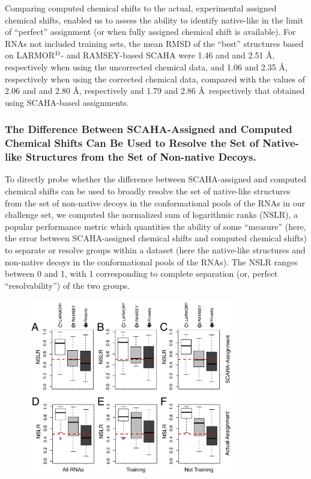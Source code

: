 \documentclass[journal=jcisd8,manuscript=article,layout=onecolumn]{achemso}
\begin{document}
{Comparing computed chemical shifts to the actual, experimental assigned chemical shifts, enabled us to assess the ability to identify native-like in the limit of ``perfect'' assignment (or when fully assigned chemical shift is available). For RNAs not included training sets, the mean RMSD of the ``best'' structures based on LARMOR$^{\rm D}$- and RAMSEY-based SCAHA were 1.46 and  and 2.51 \AA, respectively when using the uncorrected chemical data, and 1.06 and 2.35 \AA, respectively when using the corrected chemical data, compared with the values of 2.06 and  and 2.80 \AA, respectively and 1.79 and 2.86 \AA\, respectively that obtained using SCAHA-based assignments. 

\subsubsection{The Difference Between SCAHA-Assigned and Computed Chemical Shifts Can Be Used to Resolve the Set of Native-like Structures from the Set of Non-native Decoys.}
To  directly probe whether  the difference between SCAHA-assigned and computed chemical shifts can be used to broadly resolve the set of native-like structures from the set of non-native decoys in the conformational pools of the RNAs in our challenge set, we computed the normalized sum of logarithmic ranks (NSLR)\cite{venkatraman2010comprehensive}, a popular performance metric which quantities the ability of some ``measure''  (here, the error between SCAHA-assigned chemical shifts and computed chemical shifts) to separate or resolve groups within a dataset (here the native-like structures and non-native decoys in the conformational pools of the RNAs). The NSLR ranges between 0 and 1, with 1 corresponding to complete separation (or, perfect ``resolvability'') of the two groups. 
\begin{figure}[h!]
  \centering
       \includegraphics[width=0.8\textwidth]{figure_4}

\end{figure}}
\end{document}
